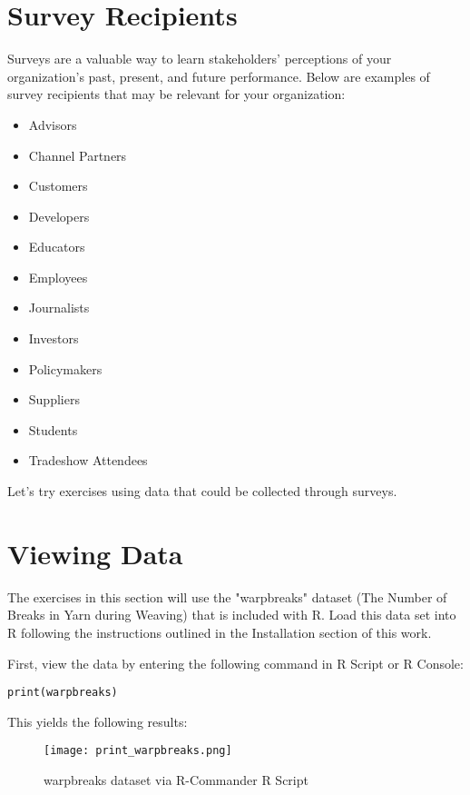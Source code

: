 %
%
%
%
%

\section{Survey Recipients}
Surveys are a valuable way to learn stakeholders' perceptions of your 
organization's past, present, and future performance. Below are examples of 
survey recipients that may be relevant for your organization:

\begin{itemize}
 \item Advisors
 \item Channel Partners
 \item Customers
 \item Developers
 \item Educators
 \item Employees
 \item Journalists
 \item Investors
 \item Policymakers
 \item Suppliers
 \item Students
 \item Tradeshow Attendees
\end{itemize}

Let's try exercises using data that could be collected through surveys.

\section{Viewing Data}
The exercises in this section will use the "warpbreaks" dataset (The Number of 
Breaks in Yarn during Weaving) that is included with R. Load this data set into
 R following the instructions outlined in the Installation section of this work.

First, view the data by entering the following command in R Script or R 
Console:

\texttt{print(warpbreaks)}

This yields the following results:

\begin{figure}[htbp]
\texttt{[image: print\_warpbreaks.png]}
 \caption{warpbreaks dataset via R-Commander R Script}
 \label{fig:print_warpbreaks}
\end{figure}


